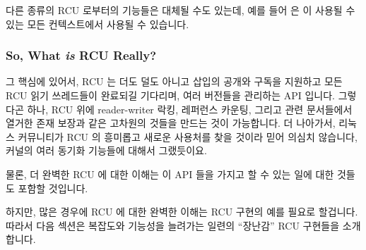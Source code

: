 다른 종류의 RCU 로부터의 기능들은 대체될 수도 있는데, 예를 들어
 은  이 사용될 수 있는 모든
컨텍스트에서 사용될 수 있습니다.
\iffalse

Figure~\ref{fig:defer:RCU API Usage Constraints}
shows which APIs may be used in which in-kernel environments.
The RCU read-side primitives may be used in any environment, including NMI,
the RCU mutation and asynchronous grace-period primitives may be used in any
environment other than NMI, and, finally, the RCU synchronous grace-period
primitives may be used only in process context.
The RCU list-traversal primitives include \co{list_for_each_entry_rcu()},
\co{hlist_for_each_entry_rcu()}, etc.
Similarly, the RCU list-mutation primitives include
\co{list_add_rcu()}, \co{hlist_del_rcu()}, etc.

Note that primitives from other families of RCU may be substituted,
for example, \co{srcu_read_lock()} may be used in any context
in which \co{rcu_read_lock()} may be used.
\fi

\subsubsection{So, What \emph{is} RCU Really?}
\label{sec:defer:So, What is RCU Really?}

그 핵심에 있어서, RCU 는 더도 덜도 아니고 삽입의 공개와 구독을 지원하고 모든
RCU 읽기 쓰레드들이 완료되길 기다리며, 여러 버전들을 관리하는 API 입니다.
그렇다곤 하나, RCU 위에 reader-writer 락킹, 레퍼런스 카운팅, 그리고 관련
문서들에서 열거한 존재 보장과 같은 고차원의 것들을 만드는 것이 가능합니다.
더 나아가서, 리눅스 커뮤니티가 RCU 의 흥미롭고 새로운 사용처를 찾을 것이라 믿어
의심치 않습니다, 커널의 여러 동기화 기능들에 대해서 그랬듯이요.

물론, 더 완벽한 RCU 에 대한 이해는 이 API 들을 가지고 할 수 있는 일에 대한
것들도 포함할 것입니다.

하지만, 많은 경우에 RCU 에 대한 완벽한 이해는 RCU 구현의 예를 필요로 할겁니다.
따라서 다음 섹션은 복잡도와 기능성을 늘려가는 일련의 ``장난감'' RCU 구현들을
소개합니다.
\iffalse

At its core, RCU is nothing more nor less than an API that supports
publication and subscription for insertions, waiting for all RCU readers
to complete, and maintenance of multiple versions.
That said, it is possible to build higher-level constructs
on top of RCU, including the reader-writer-locking, reference-counting,
and existence-guarantee constructs listed in the companion article.
Furthermore, I have no doubt that the Linux community will continue to
find interesting new uses for RCU,
just as they do for any of a number of synchronization
primitives throughout the kernel.

Of course, a more-complete view of RCU would also include
all of the things you can do with these APIs.

However, for many people, a complete view of RCU must include sample
RCU implementations.
The next section therefore presents a series of ``toy'' RCU implementations
of increasing complexity and capability.
\fi
